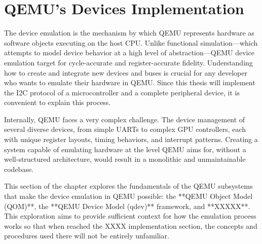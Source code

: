 \section{QEMU's Devices Implementation}
\label{chap:QEMU_dev_imp}

The device emulation is the mechanism by which QEMU represents hardware as 
software objects executing on the host CPU. Unlike functional simulation—which 
attempts to model device behavior at a high level of abstraction—QEMU device 
emulation target for cycle-accurate and register-accurate fidelity. Understanding 
how to create and integrate new devices and buses is crucial for any developer who 
wants to emulate their hardware in QEMU. Since this thesis will implement the I2C 
protocol of a microcontroller and a complete peripheral device, it is convenient to 
explain this process.

Internally, QEMU faces a very complex challenge. The device management of 
several diverse devices, from simple UARTs to complex GPU controllers, 
each with unique register layouts, timing behaviors, and interrupt patterns. Creating a 
system capable of emulating hardware at the level QEMU aims for, without a 
well-structured architecture, would result in a monolithic and unmaintainable codebase.

This section of the chapter explores the fundamentals of the QEMU subsystems 
that make the device emulation in QEMU possible: the **QEMU Object Model 
(QOM)**, the **QEMU Device Model (qdev)** framework, and **XXXXX**. This 
exploration aims to provide sufficient context for how the emulation process works so 
that when reached the XXXX implementation section, the concepts and procedures 
used there will not be entirely unfamiliar.





